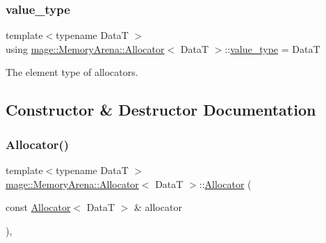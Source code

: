 \hypertarget{classmage_1_1_memory_arena_1_1_allocator_a6ae3ef840bd738889b2c4136294a4f6d}{}\label{classmage_1_1_memory_arena_1_1_allocator_a6ae3ef840bd738889b2c4136294a4f6d} 
\subsubsection{\texorpdfstring{value\+\_\+type}{value\_type}}
{\footnotesize\ttfamily template$<$typename DataT $>$ \\
using \hyperlink{classmage_1_1_memory_arena_1_1_allocator}{mage\+::\+Memory\+Arena\+::\+Allocator}$<$ DataT $>$\+::\hyperlink{classmage_1_1_memory_arena_1_1_allocator_a6ae3ef840bd738889b2c4136294a4f6d}{value\+\_\+type} =  DataT}

The element type of allocators. 

\subsection{Constructor \& Destructor Documentation}
\hypertarget{classmage_1_1_memory_arena_1_1_allocator_ac7d640d69207604612c29ebc60ec6648}{}\label{classmage_1_1_memory_arena_1_1_allocator_ac7d640d69207604612c29ebc60ec6648} 
\subsubsection{\texorpdfstring{Allocator()}{Allocator()}\hspace{0.1cm}{\footnotesize\ttfamily [1/4]}}
{\footnotesize\ttfamily template$<$typename DataT $>$ \\
\hyperlink{classmage_1_1_memory_arena_1_1_allocator}{mage\+::\+Memory\+Arena\+::\+Allocator}$<$ DataT $>$\+::\hyperlink{classmage_1_1_memory_arena_1_1_allocator}{Allocator} (\begin{DoxyParamCaption}\item[{const \hyperlink{classmage_1_1_memory_arena_1_1_allocator}{Allocator}$<$ DataT $>$ \&}]{allocator }\end{DoxyParamCaption})\hspace{0.3cm}{\ttfamily [default]}, {\ttfamily [noexcept]}}


